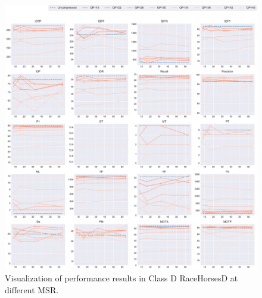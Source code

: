 \begin{figure}[!htbp]
\centering
\includegraphics[width=1.0\linewidth]{img/appendix/RaceHorsesD_all_multiplots_msr.pdf}
\caption[Visualization of performance results in Class D RaceHorsesD at different MSR]
{Visualization of performance results in Class D RaceHorsesD at different MSR.}
\label{fig:RaceHorsesD_all_msr}
\end{figure}



